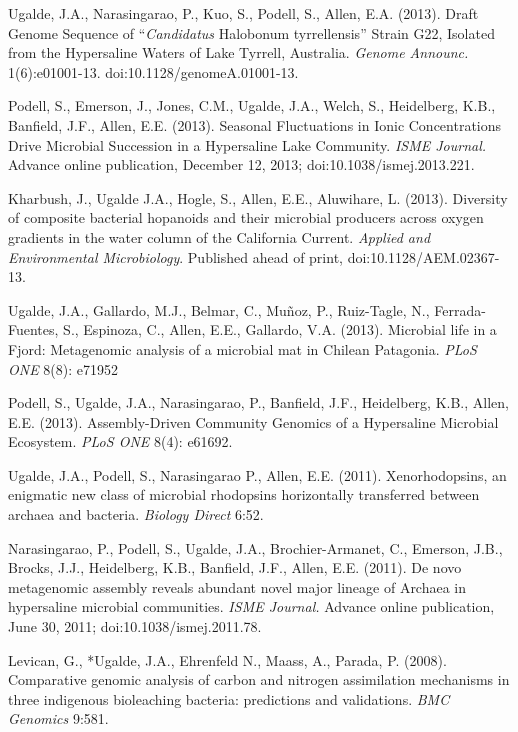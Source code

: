 \documentclass[10pt,letterpaper]{article}
\begin{document}
\begin{etaremune}
\item Ugalde, J.A., Narasingarao, P., Kuo, S., Podell, S., Allen, E.A. (2013). Draft Genome Sequence of “\textit{Candidatus} Halobonum tyrrellensis” Strain G22, Isolated from the Hypersaline Waters of Lake Tyrrell, Australia. \textit{Genome Announc.} 1(6):e01001-13. doi:10.1128/genomeA.01001-13.

\item Podell, S., Emerson, J., Jones, C.M., Ugalde, J.A., Welch, S., Heidelberg, K.B., Banfield, J.F., Allen, E.E. (2013). Seasonal Fluctuations in Ionic Concentrations Drive Microbial Succession in a Hypersaline Lake Community. \textit{ISME Journal.} Advance online publication, December 12, 2013; doi:10.1038/ismej.2013.221.

\item Kharbush, J., Ugalde J.A., Hogle, S., Allen, E.E., Aluwihare, L. (2013). Diversity of composite bacterial hopanoids and their microbial producers across oxygen gradients in the water column of the California Current. \textit{Applied and Environmental Microbiology}. Published ahead of print, doi:10.1128/AEM.02367- 13.

\item Ugalde, J.A., Gallardo, M.J., Belmar, C., Muñoz, P., Ruiz-Tagle, N., Ferrada- Fuentes, S., Espinoza, C., Allen, E.E., Gallardo, V.A. (2013). Microbial life in a Fjord: Metagenomic analysis of a microbial mat in Chilean Patagonia. \textit{PLoS ONE} 8(8): e71952

\item Podell, S., Ugalde, J.A., Narasingarao, P., Banfield, J.F., Heidelberg, K.B., Allen, E.E. (2013). Assembly-Driven Community Genomics of a Hypersaline Microbial Ecosystem. \textit{PLoS ONE} 8(4): e61692.

\item Ugalde, J.A., Podell, S., Narasingarao P., Allen, E.E. (2011). Xenorhodopsins, an enigmatic new class of microbial rhodopsins horizontally transferred between archaea and bacteria. \textit{Biology Direct} 6:52.

\item Narasingarao, P., Podell, S., Ugalde, J.A., Brochier-Armanet, C., Emerson, J.B., Brocks, J.J., Heidelberg, K.B., Banfield, J.F., Allen, E.E. (2011). De novo metagenomic assembly reveals abundant novel major lineage of Archaea in hypersaline microbial communities. \textit{ISME Journal.} Advance online publication, June 30, 2011; doi:10.1038/ismej.2011.78.

\item *Levican, G., *Ugalde, J.A., Ehrenfeld N., Maass, A., Parada, P. (2008). Comparative genomic analysis of carbon and nitrogen assimilation mechanisms in three indigenous bioleaching bacteria: predictions and validations. \textit{BMC Genomics} 9:581.


\end{etaremune}
\end{document}
